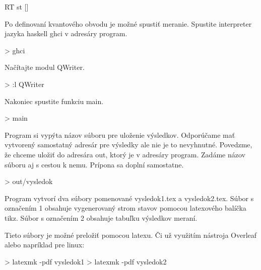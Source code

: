 \begin{code}
RT st []
\end{code}

Po definovaní kvantového obvodu je možné spustiť meranie. Spustite interpreter
jazyka haskell ghci v adresáry program.
\begin{code}
> ghci
\end{code}

Načítajte modul QWriter.
\begin{code}
> :l QWriter
\end{code}

Nakoniec spustite funkciu main.
\begin{code}
> main
\end{code}

Program si vypýta názov súboru pre uloženie výsledkov. Odporúčame mať vytvorený
samostatný adresár pre výsledky ale nie je to nevyhnutné. Povedzme, že chceme
uložiť do adresára out, ktorý je v adresáry program. Zadáme názov súboru aj 
s cestou k nemu. Prípona sa doplní samostatne.
\begin{code}
> out/vysledok
\end{code}

Program vytvorí dva súbory pomenované vysledok1.tex a vysledok2.tex. Súbor
s označením 1 obsahuje vygenerovaný strom stavov pomocou latexového balíčka
tikz. Súbor s označením 2 obsahuje tabuľku výsledkov meraní.

Tieto súbory je možné preložiť pomocou latexu. Či už využitím nástroja Overleaf
alebo napríklad pre linux:
\begin{code}
> latexmk -pdf vysledok1
> latexmk -pdf vysledok2
\end{code}
